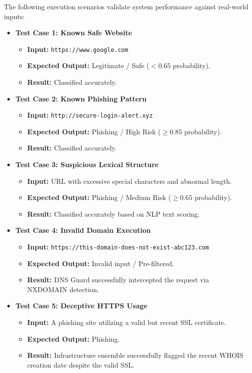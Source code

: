 \noindent
The following execution scenarios validate system performance against real-world inputs:

\begin{itemize}
    \item \textbf{Test Case 1: Known Safe Website}
    \begin{itemize}
        \item \textbf{Input:} \texttt{https://www.google.com}
        \item \textbf{Expected Output:} Legitimate / Safe ($< 0.65$ probability).
        \item \textbf{Result:} Classified accurately.
    \end{itemize}

    \item \textbf{Test Case 2: Known Phishing Pattern}
    \begin{itemize}
        \item \textbf{Input:} \texttt{http://secure-login-alert.xyz}
        \item \textbf{Expected Output:} Phishing / High Risk ($\geq 0.85$ probability).
        \item \textbf{Result:} Classified accurately.
    \end{itemize}

    \item \textbf{Test Case 3: Suspicious Lexical Structure}
    \begin{itemize}
        \item \textbf{Input:} URL with excessive special characters and abnormal length.
        \item \textbf{Expected Output:} Phishing / Medium Risk ($\geq 0.65$ probability).
        \item \textbf{Result:} Classified accurately based on NLP text scoring.
    \end{itemize}

    \item \textbf{Test Case 4: Invalid Domain Execution}
    \begin{itemize}
        \item \textbf{Input:} \texttt{https://this-domain-does-not-exist-abc123.com}
        \item \textbf{Expected Output:} Invalid input / Pre-filtered.
        \item \textbf{Result:} DNS Guard successfully intercepted the request via NXDOMAIN detection.
    \end{itemize}

    \item \textbf{Test Case 5: Deceptive HTTPS Usage}
    \begin{itemize}
        \item \textbf{Input:} A phishing site utilizing a valid but recent SSL certificate.
        \item \textbf{Expected Output:} Phishing.
        \item \textbf{Result:} Infrastructure ensemble successfully flagged the recent WHOIS creation date despite the valid SSL.
    \end{itemize}
\end{itemize}

